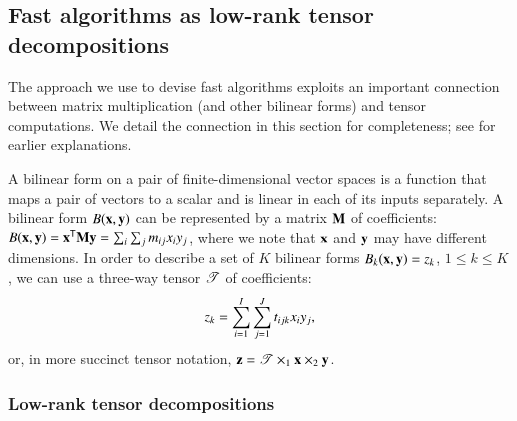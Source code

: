 \documentclass[preprint]{sigplanconf}
\newcommand{\Tra}{{\sf T}}
\newcommand{\V}[2][]{{\bm{#1\mathbf{\MakeLowercase{#2}}}}}
\newcommand{\VE}[3][]{#1{\MakeLowercase{#2}}_{#3}}
\newcommand{\M}[2][]{{\bm{#1\mathbf{\MakeUppercase{#2}}}}}
\newcommand{\ME}[3][]{#1{\MakeLowercase{#2}}_{#3}}
\newcommand{\T}[2][]{\boldsymbol{#1\mathscr{\MakeUppercase{#2}}}}
\newcommand{\TE}[3][]{#1{\MakeLowercase{#2}}_{#3}}
\begin{document}
\subsection{Fast algorithms as low-rank tensor decompositions}
\label{sec:tensor_fact}

The approach we use to devise fast algorithms exploits an important connection between matrix multiplication (and other bilinear forms) and tensor computations.
We detail the connection in this section for completeness; see \cite{Brent70,Kruskal77,Knuth81} for earlier explanations.



A bilinear form on a pair of finite-dimensional vector spaces is a function that maps a pair of vectors to a scalar and is linear in each of its inputs separately.
A bilinear form $B(\V{x},\V{y})$ can be represented by a matrix $\M{M}$ of coefficients: $B(\V{x},\V{y}) = \V{x}^{\Tra}\M{M}\V{y} = \sum_i \sum_j \ME{M}{ij} \VE{x}{i} \VE{y}{j}$, where we note that $\V{x}$ and $\V{y}$ may have different dimensions.
In order to describe a set of $K$ bilinear forms $B_k(\V{x},\V{y})=\VE{z}{k}$, $1 \le k \le K$, we can use a three-way tensor $\T{T}$ of coefficients:
\begin{equation}
\label{eqn:conventional}
\VE{z}{k} = \sum_{i=1}^I\sum_{j=1}^J \TE{T}{ijk} \VE{x}{i} \VE{y}{j},
\end{equation}
or, in more succinct tensor notation, $\V{z} = \T{T} \times_{1} \V{x} \times_{2} \V{y}$.

\subsubsection{Low-rank tensor decompositions}
\end{document}
